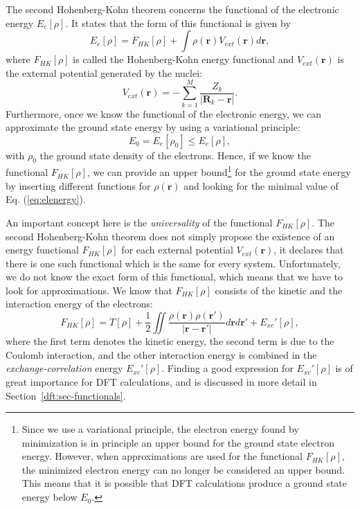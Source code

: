 \begin{refsection}
The second Hohenberg-Kohn theorem concerns the functional of the electronic energy $E_e[\rho]$. It states that the form of this functional is given by
\begin{equation}\label{eq:elenergy}
E_e[\rho] = F_{HK}[\rho] + \int \rho(\mathbf{r}) V_{ext}(\mathbf{r}) d\mathbf{r},
\end{equation}
where $F_{HK}[\rho]$ is called the Hohenberg-Kohn energy functional and $V_{ext}(\mathbf{r})$ is the external potential generated by the nuclei:
\begin{equation}
V_{ext}(\mathbf{r}) =  - \sum_{k=1}^M \frac{Z_k}{\left|\mathbf{R}_{k}-\mathbf{r}\right|}.
\end{equation}
Furthermore, once we know the functional of the electronic energy, we can approximate the ground state energy by using a variational principle:
\begin{equation}
E_0 = E_e[\rho_0] \leq E_e[\rho],
\end{equation}
with $\rho_0$ the ground state density of the electrons. Hence, if we know the functional $F_{HK}[\rho]$, we can provide an upper bound\footnote{Since we use a variational principle, the electron energy found by minimization is in principle an upper bound for the ground state electron energy. However, when approximations are used for the functional $F_{HK}[\rho]$, the minimized electron energy can no longer be considered an upper bound. This means that it is possible that DFT calculations produce a ground state energy below $E_0$.} for the ground state energy by inserting different functions for $\rho(\mathbf{r})$ and looking for the minimal value of Eq. (\ref{eq:elenergy}).

An important concept here is the \textit{universality} of the functional $F_{HK}[\rho]$. The second Hohenberg-Kohn theorem does not simply propose the existence of an energy functional $F_{HK}[\rho]$ for each external potential $V_{ext}(\mathbf{r})$, it declares that there is one such functional which is the same for every system. Unfortunately, we do not know the exact form of this functional, which means that we have to look for approximations. We know that $F_{HK}[\rho]$ consists of the kinetic and the interaction energy of the electrons:
\begin{equation}\label{eq:HKfunctional}
F_{HK}[\rho] = T[\rho] + \frac{1}{2} \iint \frac{\rho(\mathbf{r})\rho(\mathbf{r'})}{\left| \mathbf{r} - \mathbf{r'}\right|} d\mathbf{r} d\mathbf{r'} + E_{xc}'[\rho], 
\end{equation}
where the first term denotes the kinetic energy, the second term is due to the Coulomb interaction, and the other interaction energy is combined in the \textit{exchange-correlation} energy $E_{xc}'[\rho]$. Finding a good expression for $E_{xc}'[\rho]$ is of great importance for DFT calculations, and is discussed in more detail in Section~\ref{dft:sec-functionals}.


\end{refsection}
